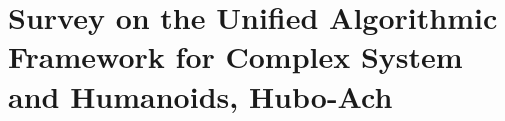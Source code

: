 \chapter{Survey on the Unified Algorithmic Framework for Complex System and Humanoids, Hubo-Ach}






